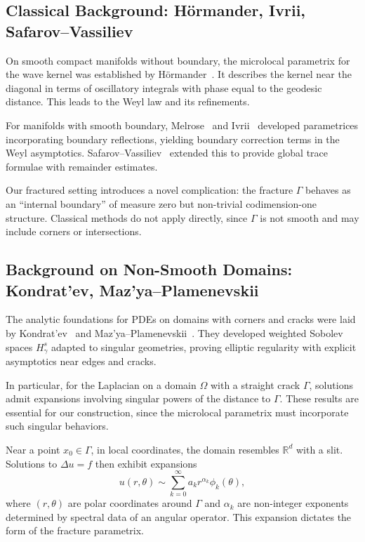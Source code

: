 \subsection*{Classical Background: Hörmander, Ivrii, Safarov–Vassiliev}

On smooth compact manifolds without boundary, the microlocal parametrix for the wave kernel was established by Hörmander~\cite{Hormander1971}. It describes the kernel near the diagonal in terms of oscillatory integrals with phase equal to the geodesic distance. This leads to the Weyl law and its refinements.

For manifolds with smooth boundary, Melrose~\cite{Melrose1980} and Ivrii~\cite{Ivrii1980} developed parametrices incorporating boundary reflections, yielding boundary correction terms in the Weyl asymptotics. Safarov–Vassiliev~\cite{SafarovVassiliev1997} extended this to provide global trace formulae with remainder estimates.

Our fractured setting introduces a novel complication: the fracture $\Gamma$ behaves as an ``internal boundary'' of measure zero but non-trivial codimension-one structure. Classical methods do not apply directly, since $\Gamma$ is not smooth and may include corners or intersections.

\subsection*{Background on Non-Smooth Domains: Kondrat'ev, Maz’ya–Plamenevskii}

The analytic foundations for PDEs on domains with corners and cracks were laid by Kondrat’ev~\cite{Kondratev1967} and Maz’ya–Plamenevskii~\cite{MazyaPlamenevskii1980}. They developed weighted Sobolev spaces $H^s_\gamma$ adapted to singular geometries, proving elliptic regularity with explicit asymptotics near edges and cracks. 

In particular, for the Laplacian on a domain $\Omega$ with a straight crack $\Gamma$, solutions admit expansions involving singular powers of the distance to $\Gamma$. These results are essential for our construction, since the microlocal parametrix must incorporate such singular behaviors.

\begin{remark}
Near a point $x_0 \in \Gamma$, in local coordinates, the domain resembles $\mathbb{R}^d$ with a slit. Solutions to $\Delta u = f$ then exhibit expansions
\[
u(r,\theta) \sim \sum_{k=0}^\infty a_k r^{\alpha_k} \phi_k(\theta),
\]
where $(r,\theta)$ are polar coordinates around $\Gamma$ and $\alpha_k$ are non-integer exponents determined by spectral data of an angular operator. This expansion dictates the form of the fracture parametrix.
\end{remark}

